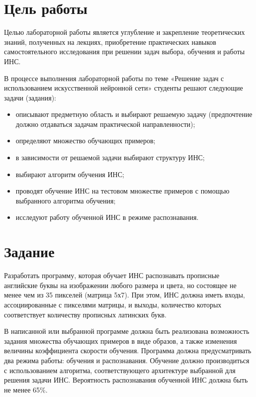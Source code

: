 \documentclass[russian,utf8,emptystyle]{eskdtext}
\begin{document}
\maketitle
\tableofcontents
\newpage

\pagestyle{plain}

\section{Цель работы}
Целью лабораторной работы является углубление и закрепление теоретических знаний, полученных на лекциях, приобретение практических навыков самостоятельного исследования при решении задач выбора, обучения и работы ИНС.

В процессе выполнения лабораторной работы по теме «Решение задач с использованием искусственной нейронной сети» студенты решают следующие задачи (задания):
\begin{itemize}
\item описывают предметную область и выбирают решаемую задачу (предпочтение должно отдаваться задачам практической направленности);
\item определяют множество обучающих примеров;
\item в зависимости от решаемой задачи выбирают структуру ИНС;
\item выбирают алгоритм обучения ИНС;
\item проводят обучение ИНС на тестовом множестве примеров с помощью выбранного алгоритма обучения;
\item исследуют работу обученной ИНС в режиме распознавания.
\end{itemize}

\section{Задание}

Разработать программу, которая обучает ИНС распознавать прописные английские буквы на изображении любого размера и цвета, но состоящее не менее чем из 35 пикселей (матрица 5х7). При этом, ИНС должна иметь входы, ассоциированные с пикселями матрицы, и выходы, количество которых соответствует количеству прописных латинских букв.

В написанной или выбранной программе должна быть реализована возможность задания множества обучающих примеров в виде образов, а также изменения величины коэффициента скорости обучения. Программа должна предусматривать два режима работы: обучения и распознавания. Обучение должно производиться с использованием алгоритма, соответствующего архитектуре выбранной для решения задачи ИНС. Вероятность распознавания обученной ИНС должна быть не менее 65\%.
\end{document}
